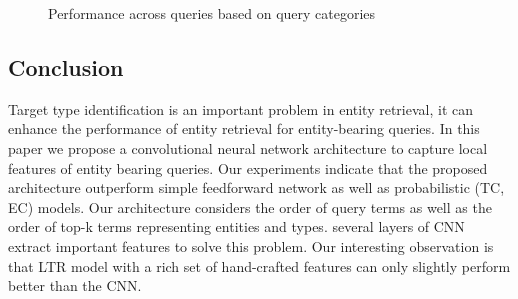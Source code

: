 \begin{figure}
	
	\caption{Performance across queries based on query categories}

\end{figure}

\subsection{Conclusion}
Target type identification is an important problem in entity retrieval, it can enhance the performance of entity retrieval for entity-bearing queries. In this paper we propose a convolutional neural network architecture to capture local features of entity bearing queries. Our experiments indicate that the proposed architecture outperform simple feedforward network as well as probabilistic (TC, EC) models. Our architecture considers the order of query terms as well as the order of top-k terms representing entities and types. several layers of CNN extract important features to solve this problem. Our interesting observation is that LTR model with a rich set of hand-crafted features can only slightly perform better than the CNN.

